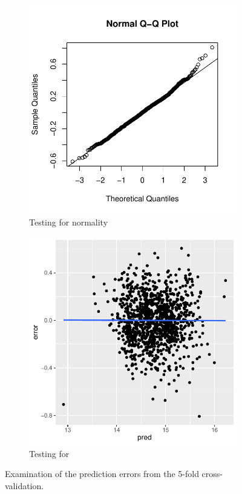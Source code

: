 \begin{figure}[H]
\centering
\begin{subfigure}[b]{0.5\textwidth}
    \centering
    \includegraphics[width = \textwidth]{figures/Nanna/Normal.pdf}
    \caption{Testing for normality}
    \label{fig:cv_normal}
\end{subfigure}%
\begin{subfigure}[b]{0.5\textwidth}
\centering
    \includegraphics[width = \textwidth]{figures/Nanna/cv_normal_homo.pdf}
    \caption{Testing for \hetero}
    \label{fig:cv_homo}
\end{subfigure}
\caption{Examination of the prediction errors from the 5-fold cross-validation.}
\label{fig:cv_normal_homo}
\end{figure}

